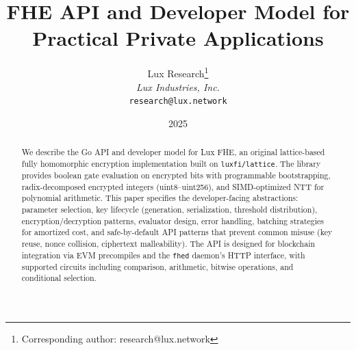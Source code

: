 \documentclass[11pt]{article}
\title{FHE API and Developer Model for Practical Private Applications}
\author{
Lux Research\thanks{Corresponding author: research@lux.network}\\
\textit{Lux Industries, Inc.}\\
\texttt{research@lux.network}
}
\date{2025}
\begin{document}
\luxcoverpage

\begin{abstract}
We describe the Go API and developer model for Lux FHE, an original lattice-based fully homomorphic encryption implementation built on \texttt{luxfi/lattice}. The library provides boolean gate evaluation on encrypted bits with programmable bootstrapping, radix-decomposed encrypted integers (uint8--uint256), and SIMD-optimized NTT for polynomial arithmetic. This paper specifies the developer-facing abstractions: parameter selection, key lifecycle (generation, serialization, threshold distribution), encryption/decryption patterns, evaluator design, error handling, batching strategies for amortized cost, and safe-by-default API patterns that prevent common misuse (key reuse, nonce collision, ciphertext malleability). The API is designed for blockchain integration via EVM precompiles and the \texttt{fhed} daemon's HTTP interface, with supported circuits including comparison, arithmetic, bitwise operations, and conditional selection.
\end{abstract}










\end{document}
